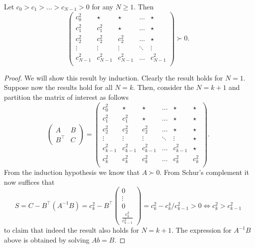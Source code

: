 \documentclass{article}
\begin{document}
\begin{toappendix}
\begin{lemma}
  \label{lemma:psd}
  Let $c_0>c_1>\dots>c_{N-1}>0$ for any $N\geq 1$. Then
  \[
   \left(\begin{array}{ccccc}
       c_{0}^2  & \star & \star  & \dots & \star \\
       c_{1}^2 & c_{1}^2   & \star & \dots & \star \\
        c_{2}^2     & c_{2}^2   & c_{2}^2   & \dots & \star \\
       \vdots &  \vdots & \vdots & \ddots & \vdots \\
       c_{N-1}^2   & c_{N-1}^2   & c_{N-1}^2   & \dots & c_{N-1}^2    \\
   \end{array}\right)\succ 0.
 \]
\end{lemma}
\begin{proof}
  We will show this result by induction.
  Clearly the result holds for $N=1$. Suppose now the results hold for all $N=k$. Then, consider the $N=k+1$ and partition the matrix of interest as follows
  \[
    \begin{pmatrix}
      A & B\\
      B^\top & C
    \end{pmatrix}
    =
    \left(\begin{array}{ccccc|c}
      c_{0}^2  & \star & \star  & \dots & \star & \star \\
      c_{1}^2 & c_{1}^2   & \star & \dots & \star & \star\\
      c_{2}^2     & c_{2}^2   & c_{2}^2   & \dots & \star & \star \\
      \vdots &  \vdots & \vdots & \ddots & \vdots & \star\\
      c_{k-1}^2   & c_{k-1}^2   & c_{k-1}^2   & \dots & c_{k-1}^2  & \star  \\
      \hline
      c_{k}^2   & c_{k}^2   & c_{k}^2   & \dots & c^2_{k} & c_{k}^2    \\
    \end{array}\right).
\]
From the induction hypothesis we know that $A\succ 0$. From Schur's complement it now suffices that
\[
  S = C-B^\top \left(A^{-1} B\right) =c_k^2- B^\top \begin{pmatrix} 0 \\ \vdots \\ 0 \\ \frac{c_k^2}{c^2_{k-1}} \end{pmatrix}  = c_k^2 - c_k^4/c_{k-1}^2>0\iff c^2_{k}>c^2_{k-1}
\]
to claim that indeed the result also holds for $N=k+1$. 
The expression for $A^{-1}B$ above is obtained by solving $Ab=B$.
\end{proof}


\end{toappendix}
\end{document}
